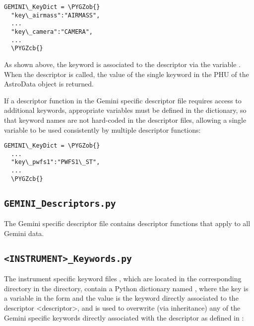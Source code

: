 \documentclass[letterpaper,10pt,english]{sphinxmanual}
\def\PYGZob{\char`\{}
\def\PYGZcb{\char`\}}
\begin{document}
\begin{Verbatim}[commandchars=\\\{\}]
GEMINI\_KeyDict = \PYGZob{}
  "key\_airmass":"AIRMASS",
  ...
  "key\_camera":"CAMERA",
  ...
  \PYGZcb{}
\end{Verbatim}

As shown above, the  keyword is associated to the 
descriptor via the variable . When the  descriptor is
called, the value of the single keyword  in the PHU of the AstroData
object is returned.

If a descriptor function in the Gemini specific descriptor file
 requires access to additional keywords, appropriate
variables must be defined in the  dictionary, so that keyword
names are not hard-coded in the descriptor files, allowing a single variable
to be used consistently by multiple descriptor functions:

\begin{Verbatim}[commandchars=\\\{\}]
GEMINI\_KeyDict = \PYGZob{}
  ...
  "key\_pwfs1":"PWFS1\_ST",
  ...
  \PYGZcb{}
\end{Verbatim}


\subsection{\texttt{GEMINI\_Descriptors.py}}
\label{coding:gemini-descriptors-py}
The Gemini specific descriptor file  contains
descriptor functions that apply to all Gemini data.


\subsection{\texttt{\textless{}INSTRUMENT\textgreater{}\_Keywords.py}}
\label{coding:instrument-keywords-py}
The instrument specific keyword files , which are
located in the corresponding  directory in the
 directory, contain a Python
dictionary named , where the key is a variable in the
form  and the value is the keyword directly associated to
the descriptor \textless{}descriptor\textgreater{}, and is used to overwrite (via inheritance) any of
the Gemini specific keywords directly associated with the descriptor as defined
in :
\end{document}
